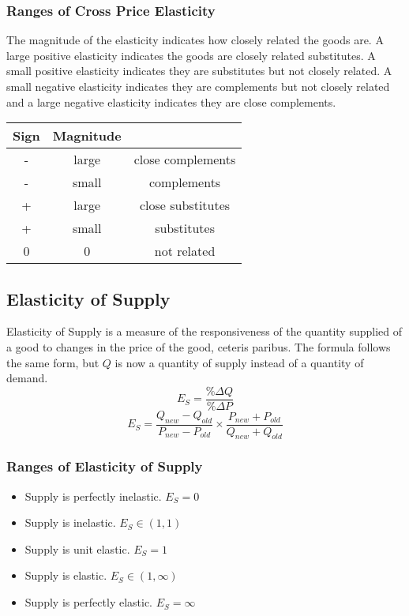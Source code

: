 \documentclass{article}
\begin{document}
\subsubsection{Ranges of Cross Price Elasticity}
The magnitude of the elasticity indicates how closely related the goods are.
A large positive elasticity indicates the goods are closely related substitutes.
A small positive elasticity indicates they are substitutes but not closely
related. A small negative elasticity indicates they are complements but not
closely related and a large negative elasticity indicates they are close
complements.
\begin{center}
  \begin{tabular}{|c|c|c|}
    \hline
    Sign & Magnitude & \\ \hline
    -    & large     & close complements\\ \hline
    -    & small     & complements \\ \hline
    +    & large     & close substitutes \\ \hline
    +    & small     & substitutes \\ \hline
    0    & 0         & not related \\ \hline
  \end{tabular}
\end{center}

\subsection{Elasticity of Supply}
Elasticity of Supply is a measure of the responsiveness of the quantity supplied
of a good to changes in the price of the good, ceteris paribus. The formula
follows the same form, but \( Q \) is now a quantity of supply instead of a
quantity of demand.
\[ E_{S} = \frac{\%\Delta Q}{\%\Delta P} \]
\[ E_{S} = \frac{Q_{new}-Q_{old}}{P_{new}-P_{old}}\times
           \frac{P_{new}+P_{old}}{Q_{new}+Q_{old}} \]

\subsubsection{Ranges of Elasticity of Supply}
\begin{itemize}
  \item Supply is perfectly inelastic. \( E_{S} = 0 \)
  \item Supply is inelastic. \( E_{S} \in (1, 1) \)
  \item Supply is unit elastic. \( E_{S} = 1 \)
  \item Supply is elastic. \( E_{S} \in (1, \infty) \)
  \item Supply is perfectly elastic. \( E_{S} = \infty \)
\end{itemize}
\end{document}
